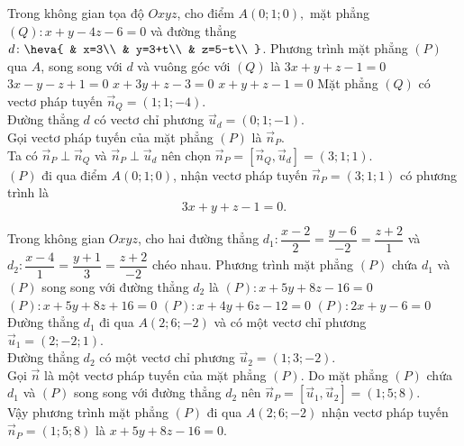 \begin{ex}%
Trong không gian tọa độ $ Oxyz$, cho điểm $ A(0;1;0),$ mặt phẳng  $(Q)\colon x+y-4z-6=0$ và đường thẳng $ d\colon\heva{
& x=3\\ 
& y=3+t\\ 
& z=5-t\\ 
}$. Phương trình mặt phẳng $(P)$ qua $ A$, song song với $ d$ và vuông góc với $(Q)$ là 
\choice
{\True $ 3x+y+z-1=0$}
{$ 3x-y-z+1=0$}
{$ x+3y+z-3=0$}
{$ x+y+z-1=0$}
\loigiai
{
Mặt phẳng $(Q)$ có vectơ pháp tuyến $\overrightarrow{n}_Q=(1;1;-4)$.\\
Đường thẳng $ d$ có vectơ chỉ phương $\overrightarrow{u}_d=(0;1;-1)$.\\
Gọi vectơ pháp tuyến của mặt phẳng $(P)$ là $\overrightarrow{n}_P$.\\
Ta có $\overrightarrow{n}_P\perp\overrightarrow{n}_Q$ và $\overrightarrow{n}_P\perp\overrightarrow{u}_d$ nên chọn $\overrightarrow{n}_P=\left[\overrightarrow{n}_Q,\overrightarrow{u}_d\right]=(3;1;1)$.\\
$(P)$ đi qua điểm $ A(0;1;0)$, nhận vectơ pháp tuyến $\overrightarrow{n}_P=(3;1;1)$ có phương trình là $$ 3x+y+z-1=0.$$}
\end{ex}

\begin{ex}%
Trong không gian $Oxyz$, cho hai đường thẳng $d_1\colon\dfrac{x-2}{2}=\dfrac{y-6}{-2}=\dfrac{z+2}{1}$ và $d_2\colon\dfrac{x-4}{1}=\dfrac{y+1}{3}=\dfrac{z+2}{-2}$ chéo nhau. Phương trình mặt phẳng $(P)$ chứa $d_1$ và $(P)$ song song với đường thẳng $d_2$ là
\choice
{\True $(P)\colon x+5y+8z-16=0$}
{$(P)\colon x+5y+8z+16=0$}
{$(P)\colon x+4y+6z-12=0$}
{$(P)\colon 2x+y-6=0$}
\loigiai
{
Đường thẳng $d_1$ đi qua $ A\left(2;6;-2\right)$ và có một vectơ chỉ phương $\overrightarrow{u}_1=\left(2;-2;1\right)$.\\
Đường thẳng $d_2$ có một vectơ chỉ phương $\overrightarrow{u}_2=(1;3;-2)$.\\
Gọi $\overrightarrow{n}$ là một vectơ pháp tuyến của mặt phẳng $(P)$. Do mặt phẳng $(P)$ chứa $d_1$ và $(P)$ song song với đường thẳng $d_2$ nên $\overrightarrow{n}_P=\left[\overrightarrow{u}_1,\overrightarrow{u}_2\right]=(1;5;8)$.\\
Vậy phương trình mặt phẳng $(P)$ đi qua $ A(2;6;-2)$ nhận vectơ pháp tuyến $\overrightarrow{n}_P=(1;5;8)$ là $ x+5y+8z-16=0$.}
\end{ex}

